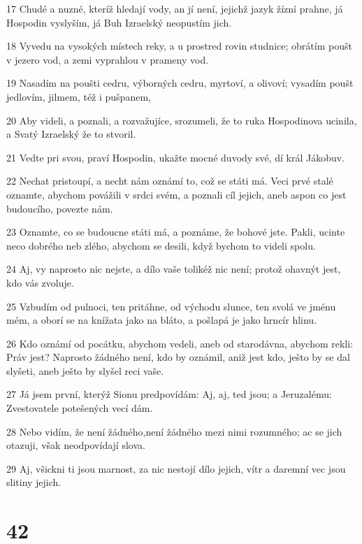 \par 17 Chudé a nuzné, kteríž hledají vody, an jí není, jejichž jazyk žízní prahne, já Hospodin vyslyším, já Buh Izraelský neopustím jich.
\par 18 Vyvedu na vysokých místech reky, a u prostred rovin studnice; obrátím poušt v jezero vod, a zemi vyprahlou v prameny vod.
\par 19 Nasadím na poušti cedru, výborných cedru, myrtoví, a olivoví; vysadím poušt jedlovím, jilmem, též i pušpanem,
\par 20 Aby videli, a poznali, a rozvažujíce, srozumeli, že to ruka Hospodinova ucinila, a Svatý Izraelský že to stvoril.
\par 21 Vedte pri svou, praví Hospodin, ukažte mocné duvody své, dí král Jákobuv.
\par 22 Nechat pristoupí, a necht nám oznámí to, což se státi má. Veci prvé stalé oznamte, abychom povážili v srdci svém, a poznali cíl jejich, aneb aspon co jest budoucího, povezte nám.
\par 23 Oznamte, co se budoucne státi má, a poznáme, že bohové jste. Pakli, ucinte neco dobrého neb zlého, abychom se desili, když bychom to videli spolu.
\par 24 Aj, vy naprosto nic nejste, a dílo vaše tolikéž nic není; protož ohavnýt jest, kdo vás zvoluje.
\par 25 Vzbudím od pulnoci, ten pritáhne, od východu slunce, ten svolá ve jménu mém, a oborí se na knížata jako na bláto, a pošlapá je jako hrncír hlinu.
\par 26 Kdo oznámí od pocátku, abychom vedeli, aneb od starodávna, abychom rekli: Práv jest? Naprosto žádného není, kdo by oznámil, aniž jest kdo, ješto by se dal slyšeti, aneb ješto by slyšel reci vaše.
\par 27 Já jsem první, kterýž Sionu predpovídám: Aj, aj, ted jsou; a Jeruzalému: Zvestovatele potešených vecí dám.
\par 28 Nebo vidím, že není žádného,není žádného mezi nimi rozumného; ac se jich otazuji, však neodpovídají slova.
\par 29 Aj, všickni ti jsou marnost, za nic nestojí dílo jejich, vítr a daremní vec jsou slitiny jejich.

\chapter{42}

